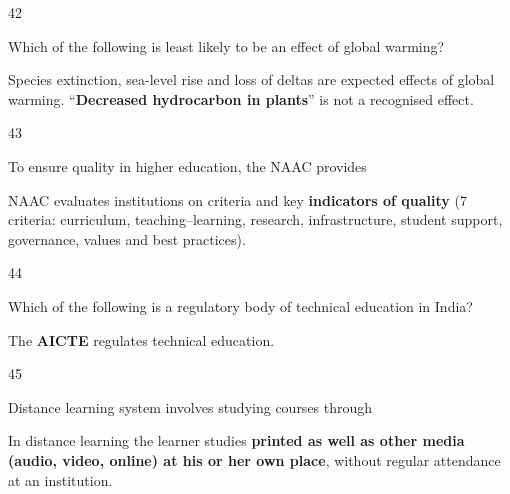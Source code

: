 \begin{question}{42}
{Which of the following is least likely to be an effect of global warming?\par}
\begin{explain}
Species extinction, sea-level rise and loss of deltas are expected effects of global warming. ``\textbf{Decreased hydrocarbon in plants}'' is not a recognised effect.
\end{explain}
\end{question}

\begin{question}{43}
{To ensure quality in higher education, the NAAC provides\par}
\begin{explain}
NAAC evaluates institutions on criteria and key \textbf{indicators of quality} (7 criteria: curriculum, teaching--learning, research, infrastructure, student support, governance, values and best practices).
\end{explain}
\end{question}

\begin{question}{44}
{Which of the following is a regulatory body of technical education in India?\par}
\begin{explain}
The \textbf{AICTE} regulates technical education.
\end{explain}
\end{question}

\begin{question}{45}
{Distance learning system involves studying courses through\par}
\begin{explain}
In distance learning the learner studies \textbf{printed as well as other media (audio, video, online) at his or her own place}, without regular attendance at an institution.
\end{explain}
\end{question}

